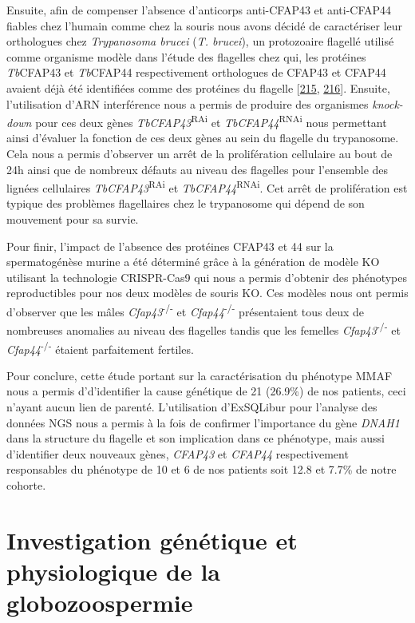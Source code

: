 \documentclass[12pt,a4paper,twoside]{ugathesis}
\theoremstyle{definition}
\theoremstyle{definition}
\theoremstyle{definition}
\theoremstyle{remark}
\begin{document}
Ensuite, afin de compenser l'absence d'anticorps anti-CFAP43 et
anti-CFAP44 fiables chez l'humain comme chez la souris nous avons décidé
de caractériser leur orthologues chez \emph{Trypanosoma brucei}
(\emph{T. brucei}), un protozoaire flagellé utilisé comme organisme
modèle dans l'étude des flagelles chez qui, les protéines
\emph{Tb}CFAP43 et \emph{Tb}CFAP44 respectivement orthologues de CFAP43
et CFAP44 avaient déjà été identifiées comme des protéines du flagelle
{[}\protect\hyperlink{ref-Broadhead2006}{215},
\protect\hyperlink{ref-Subota2014}{216}{]}. Ensuite, l'utilisation d'ARN
interférence nous a permis de produire des organismes \emph{knock-down}
pour ces deux gènes \emph{TbCFAP43}\textsuperscript{RAi} et
\emph{TbCFAP44}\textsuperscript{RNAi} nous permettant ainsi d'évaluer la
fonction de ces deux gènes au sein du flagelle du trypanosome. Cela nous
a permis d'observer un arrêt de la prolifération cellulaire au bout de
24h ainsi que de nombreux défauts au niveau des flagelles pour
l'ensemble des lignées cellulaires \emph{TbCFAP43}\textsuperscript{RAi}
et \emph{TbCFAP44}\textsuperscript{RNAi}. Cet arrêt de prolifération est
typique des problèmes flagellaires chez le trypanosome qui dépend de son
mouvement pour sa survie.

Pour finir, l'impact de l'absence des protéines CFAP43 et 44 sur la
spermatogénèse murine a été déterminé grâce à la génération de modèle KO
utilisant la technologie CRISPR-Cas9 qui nous a permis d'obtenir des
phénotypes reproductibles pour nos deux modèles de souris KO. Ces
modèles nous ont permis d'observer que les mâles
\emph{Cfap43}\textsuperscript{-/-} et \emph{Cfap44}\textsuperscript{-/-}
présentaient tous deux de nombreuses anomalies au niveau des flagelles
tandis que les femelles \emph{Cfap43}\textsuperscript{-/-} et
\emph{Cfap44}\textsuperscript{-/-} étaient parfaitement fertiles.

Pour conclure, cette étude portant sur la caractérisation du phénotype
MMAF nous a permis d'd'identifier la cause génétique de 21 (26.9\%) de
nos patients, ceci n'ayant aucun lien de parenté. L'utilisation
d'ExSQLibur pour l'analyse des données NGS nous a permis à la fois de
confirmer l'importance du gène \emph{DNAH1} dans la structure du
flagelle et son implication dans ce phénotype, mais aussi d'identifier
deux nouveaux gènes, \emph{CFAP43} et \emph{CFAP44} respectivement
responsables du phénotype de 10 et 6 de nos patients soit 12.8 et 7.7\%
de notre cohorte.

\hypertarget{globo}{\chapter{Investigation génétique et physiologique de
la globozoospermie}\label{globo}}
\end{document}
